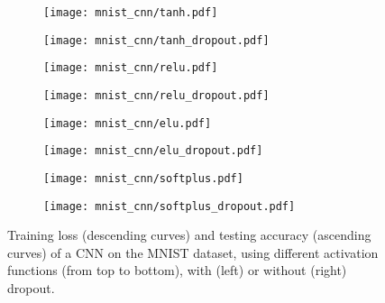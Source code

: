 \documentclass{article}
\newlength{\myfigwidth}
\begin{document}
\begin{figure*}%
\centering
\begin{subfigure}[b]{\myfigwidth}
\texttt{[image: mnist\_cnn/tanh.pdf]}
\end{subfigure}
\begin{subfigure}[b]{\myfigwidth}
\texttt{[image: mnist\_cnn/tanh\_dropout.pdf]}
\end{subfigure}
\begin{subfigure}[b]{\myfigwidth}
\texttt{[image: mnist\_cnn/relu.pdf]}
\end{subfigure}
\begin{subfigure}[b]{\myfigwidth}
\texttt{[image: mnist\_cnn/relu\_dropout.pdf]}
\end{subfigure}
\begin{subfigure}[b]{\myfigwidth}
\texttt{[image: mnist\_cnn/elu.pdf]}
\end{subfigure}
\begin{subfigure}[b]{\myfigwidth}
\texttt{[image: mnist\_cnn/elu\_dropout.pdf]}
\end{subfigure}
\begin{subfigure}[b]{\myfigwidth}
\texttt{[image: mnist\_cnn/softplus.pdf]}
\end{subfigure}
\begin{subfigure}[b]{\myfigwidth}
\texttt{[image: mnist\_cnn/softplus\_dropout.pdf]}
\end{subfigure}
\caption{Training loss (descending curves) and testing accuracy (ascending curves) of a CNN on the MNIST dataset,
using different activation functions (from top to bottom), with (left) or without (right) dropout.}\label{fig:mnistcnn}
\end{figure*}
\end{document}
